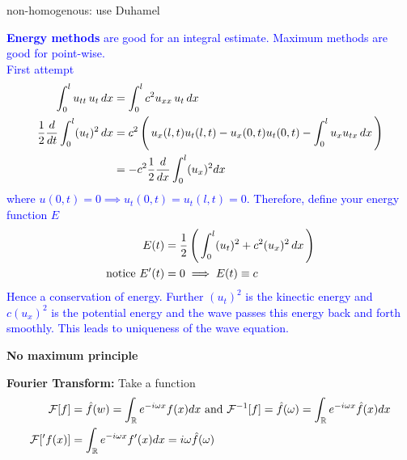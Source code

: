 \documentclass[12pt,a4paper]{report}
\newcommand{\BLUE}[1]{\textcolor{blue}{#1}}
\begin{document}
{\begin{description}
\begin{itemize}
         \item non-homogenous: use Duhamel
         
		
		\BLUE{\item \textbf{Energy methods} are good for an integral estimate.  Maximum methods are good for point-wise.\\
		First attempt\begin{align*}
			\int_0^l u_{tt}\,u_t \,dx &= \int_0^l c^2u_{xx}\,u_t \,dx \\
			\frac{1}{2} \frac{d}{dt}\int_0^l (u_t)^2\, dx &= c^2\left (\, u_x(l,t)u_t(l,t)-u_x(0,t)u_t(0,t)-\int_0^l u_x u_{tx} \,dx \,\right ) \\
			&= -c^2 \frac{1}{2}\frac{d}{dx} \int_0^l (u_x)^2 dx
		\end{align*}where $u(0,t) = 0 \implies u_t(0,t)=u_t(l,t) = 0$.  Therefore, define your energy function $E$
		\begin{align*}
			E(t) &= \frac{1}{2}\left (\, \int_0^l (u_t)^2 + c^2 (u_x)^2\, dx \,\right ) \\
			\text{notice } E'(t) &= 0 \implies E(t) \equiv c
		\end{align*}Hence a conservation of energy.  Further $(u_t)^2$ is the kinectic energy and $c(u_x)^2$ is the potential energy and the wave passes this energy back and forth smoothly.  This leads to uniqueness of the wave equation.
		}
		\item \textbf{No maximum principle}
	\end{itemize}
	
	\item \textbf{Fourier Transform:}  Take a function 
	\begin{align*}
	\mathcal{F}[f] &= \hat{f}(w) = \int_{\mathbb{R}} e^{-i\omega x}f(x) dx \text{ and } \mathcal{F}^{-1}[f] = \hat{f}(\omega ) = \int_{\mathbb{R}} e^{-i\omega x}\hat{f}(x) dx \\
		\mathcal{F}['f(x)] &=  \int_{\mathbb{R}} e^{-i\omega x}f'(x) dx = i\omega  \hat{f}(\omega )
	\end{align*}


\end{description}}
\end{document}
